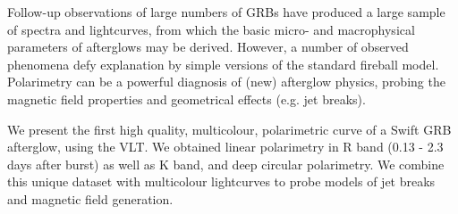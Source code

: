 


\bigskip



\bigskip

\noindent Follow-up observations of large numbers of GRBs have produced a large sample of spectra and lightcurves, from which the basic micro- and macrophysical parameters of afterglows may be derived. However, a number of observed phenomena defy explanation by simple versions of the standard fireball model. Polarimetry can be a powerful diagnosis of (new) afterglow physics, probing the magnetic field properties and geometrical effects (e.g. jet breaks). 

We present the first high quality, multicolour, polarimetric curve of a Swift GRB afterglow, using the VLT. We obtained linear polarimetry in R band (0.13 - 2.3 days after burst) as well as K band, and deep circular polarimetry. We combine this unique dataset with multicolour lightcurves to probe models of jet breaks and magnetic field generation.

